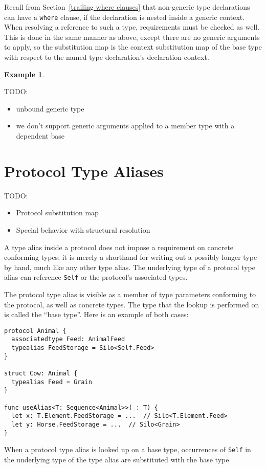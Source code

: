 \documentclass[a4paper,headsepline,bibliography=totoc,toc=flat,fleqn,twoside=semi]{scrbook}
\theoremstyle{definition}
\theoremstyle{definition}
\newtheorem{example}{Example}[chapter]
\theoremstyle{definition}
\newcommand{\ifWIP}{\iffalse}
\begin{document}
Recall from Section~\ref{trailing where clauses} that non-generic type declarations can have a \texttt{where} clause, if the declaration is nested inside a generic context. When resolving a reference to such a type, requirements must be checked as well. This is done in the same manner as above, except there are no generic arguments to apply, so the substitution map is the context substitution map of the base type with respect to the named type declaration's declaration context.

\begin{example}

\end{example}

TODO:
\begin{itemize}
\item unbound generic type
\item we don't support generic arguments applied to a member type with a dependent base
\end{itemize}
\fi

\section{Protocol Type Aliases}\label{protocol type alias}

\ifWIP
TODO:
\begin{itemize}
\item Protocol substitution map
\item Special behavior with structural resolution
\end{itemize}

A type alias inside a protocol does not impose a requirement on concrete conforming types; it is merely a shorthand for writing out a possibly longer type by hand, much like any other type alias. The underlying type of a protocol type alias can reference \texttt{Self} or the protocol's associated types.

The protocol type alias is visible as a member of type parameters conforming to the protocol, as well as concrete types. The type that the lookup is performed on is called the ``base type''. Here is an example of both cases:
\begin{Verbatim}
protocol Animal {
  associatedtype Feed: AnimalFeed
  typealias FeedStorage = Silo<Self.Feed>
}

struct Cow: Animal {
  typealias Feed = Grain
}

func useAlias<T: Sequence<Animal>>(_: T) {
  let x: T.Element.FeedStorage = ...  // Silo<T.Element.Feed>
  let y: Horse.FeedStorage = ...  // Silo<Grain>
}
\end{Verbatim}
When a protocol type alias is looked up on a base type, occurrences of \texttt{Self} in the underlying type of the type alias are substituted with the base type.
\end{document}
